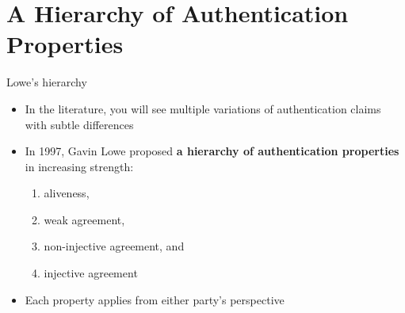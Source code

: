 \documentclass[11pt,aspectratio=169]{beamer}
\begin{document}
\section{A Hierarchy of Authentication Properties}


\begin{frame}[fragile]{Lowe's hierarchy}
    \begin{itemize}
        \item In the literature, you will see multiple variations of 
              authentication claims with subtle differences
        \item In 1997, Gavin Lowe proposed
              \textbf{a hierarchy of authentication properties} in increasing 
              strength:
        \begin{enumerate}
            \item aliveness,
            \item weak agreement,
            \item non-injective agreement, and
            \item injective agreement
        \end{enumerate}
        \item Each property applies from either party's perspective
    \end{itemize}
\end{frame}
\end{document}
